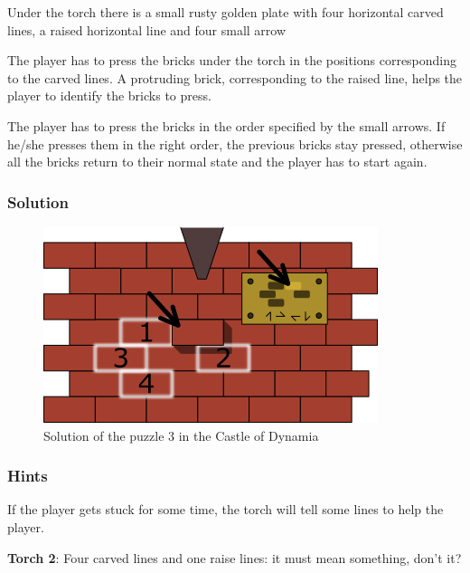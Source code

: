 

Under the torch there is a small rusty golden plate with four horizontal carved lines, a raised horizontal line and four small arrow

The player has to press the bricks under the torch in the positions corresponding to the carved lines. A protruding brick, corresponding to the raised line, helps the player to identify the bricks to press.

The player has to press the bricks in the order specified by the small arrows. If he/she presses them in the right order, the previous bricks stay pressed, otherwise all the bricks return to their normal state and the player has to start again.

\subsubsection*{Solution}
\begin{figure}[H]
  \centering
  \includegraphics[width=\textwidth]{Images/Puzzles/castleOfDynamia3Solution}
  \caption{Solution of the puzzle 3 in the Castle of Dynamia}
\end{figure}

\subsubsection*{Hints}
If the player gets stuck for some time, the torch will tell some lines to help the player.

\textbf{Torch 2}: Four carved lines and one raise lines: it must mean something, don't it?

